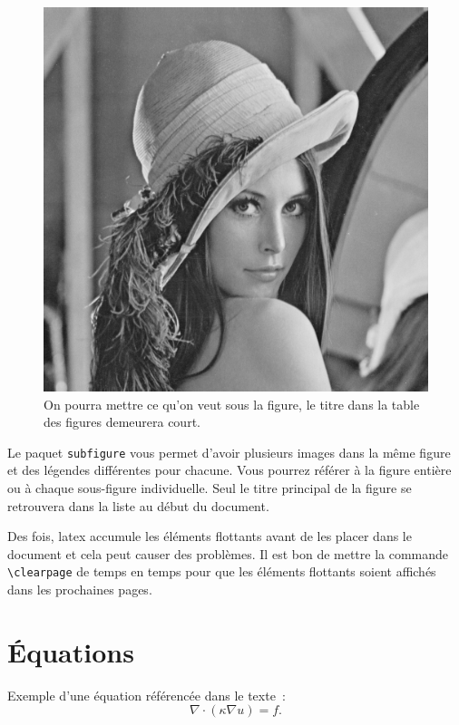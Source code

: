 \begin{figure}[tb]
	\centering
	\includegraphics[width=0.45\linewidth]{lena} 
	\caption[Titre pour la liste des figures]{On pourra mettre ce qu'on veut sous la figure, le titre dans la table des figures demeurera court.}
	\label{fig:figureSeule}
\end{figure}

Le paquet \texttt{subfigure} vous permet d'avoir plusieurs images dans la même figure et des légendes différentes pour chacune. Vous pourrez référer à la figure entière ou à chaque sous-figure individuelle. Seul le titre principal de la figure se retrouvera dans la liste au début du document.


\clearpage

Des fois, latex accumule les éléments flottants avant de les placer dans le document et cela peut causer des problèmes. Il est bon de mettre la commande \verb|\clearpage| de temps en temps pour que les éléments flottants soient affichés dans les prochaines pages.

\section{Équations}

Exemple d'une équation référencée dans le texte~:
\begin{equation}\label{eq:heatConserv}
	\nabla \cdot (\kappa \nabla u) = f.
\end{equation}

